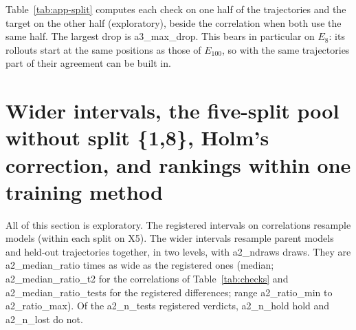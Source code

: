 Table~\ref{tab:app-split} computes each check on one half of the trajectories and the target on the other half
(exploratory), beside the correlation when both use the same half. The largest drop is {{a3_max_drop}}.
This bears in particular on $E_8$: its rollouts start at the same positions as those of $E_{100}$, so with the same
trajectories part of their agreement can be built in.

\begin{table}[h]
\centering
\caption{Split-half check (exploratory): Spearman correlation with $E_{100}$ when the check and the target come from
different halves of the held-out trajectories, with its 95\% interval, and when both come from the same half.}
\label{tab:app-split}
\footnotesize
\setlength{\tabcolsep}{4pt}
\end{table}

\FloatBarrier
\section{Wider intervals, the five-split pool without split \{1,8\}, Holm's correction, and rankings within one training method}\label{app:A4}
All of this section is exploratory. The registered intervals on correlations resample models (within each split on
X5). The wider intervals resample parent models and held-out trajectories together, in two levels, with {{a2_ndraws}} draws. They are {{a2_median_ratio}} times as wide as the
registered ones (median; {{a2_median_ratio_t2}} for the correlations of Table~\ref{tab:checks} and {{a2_median_ratio_tests}} for
the registered differences; range {{a2_ratio_min}} to {{a2_ratio_max}}). Of the {{a2_n_tests}} registered verdicts,
{{a2_n_hold}} hold and {{a2_n_lost}} do not.


